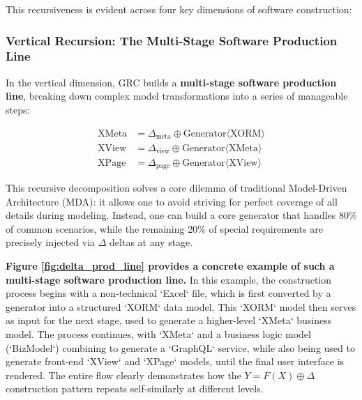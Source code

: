 \documentclass[11pt]{article}
\begin{document}
This recursiveness is evident across four key dimensions of software construction:

\subsubsection{Vertical Recursion: The Multi-Stage Software Production Line}

In the vertical dimension, GRC builds a \textbf{multi-stage software production line}, breaking down complex model transformations into a series of manageable steps:

\begin{align*}
\text{XMeta} &= \Delta_{\text{meta}} \oplus \text{Generator}\langle\text{XORM}\rangle \\
\text{XView} &= \Delta_{\text{view}} \oplus \text{Generator}\langle\text{XMeta}\rangle \\
\text{XPage} &= \Delta_{\text{page}} \oplus \text{Generator}\langle\text{XView}\rangle
\end{align*}

This recursive decomposition solves a core dilemma of traditional Model-Driven Architecture (MDA): it allows one to avoid striving for perfect coverage of all details during modeling. Instead, one can build a core generator that handles 80\% of common scenarios, while the remaining 20\% of special requirements are precisely injected via $\Delta$ deltas at any stage.

\textbf{Figure \ref{fig:delta_prod_line} provides a concrete example of such a multi-stage software production line.} In this example, the construction process begins with a non-technical `Excel` file, which is first converted by a generator into a structured `XORM` data model. This `XORM` model then serves as input for the next stage, used to generate a higher-level `XMeta` business model. The process continues, with `XMeta` and a business logic model (`BizModel`) combining to generate a `GraphQL` service, while also being used to generate front-end `XView` and `XPage` models, until the final user interface is rendered. The entire flow clearly demonstrates how the $Y = F(X) \oplus \Delta$ construction pattern repeats self-similarly at different levels.
\end{document}
